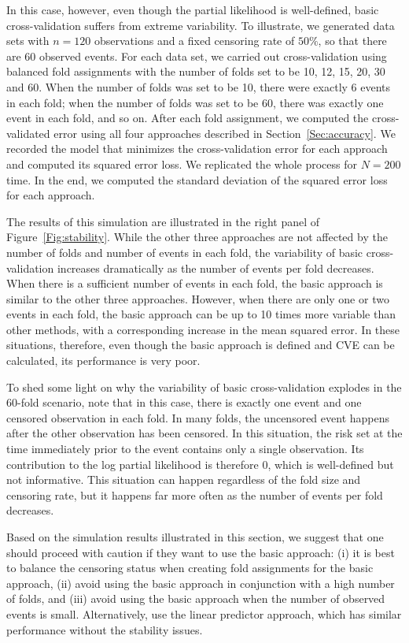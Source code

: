 In this case, however, even though the partial likelihood is well-defined, basic cross-validation suffers from extreme variability.  To illustrate, we generated data sets with $n = 120$ observations and a fixed censoring rate of $50\%$, so that there are 60 observed events. For each data set, we carried out cross-validation using balanced fold assignments with the number of folds set to be 10, 12, 15, 20, 30 and 60. When the number of folds was set to be 10, there were exactly 6 events in each fold; when the number of folds was set to be 60, there was exactly one event in each fold, and so on. After each fold assignment, we computed the cross-validated error using all four approaches described in Section~\ref{Sec:accuracy}. We recorded the model that minimizes the cross-validation error for each approach and computed its squared error loss. We replicated the whole process for $N = 200$ time. In the end, we computed the standard deviation of the squared error loss for each approach. 

The results of this simulation are illustrated in the right panel of Figure~\ref{Fig:stability}. While the other three approaches are not affected by the number of folds and number of events in each fold, the variability of basic cross-validation increases dramatically as the number of events per fold decreases. When there is a sufficient number of events in each fold, the basic approach is similar to the other three approaches. However, when there are only one or two events in each fold, the basic approach can be up to 10 times more variable than other methods, with a corresponding increase in the mean squared error.  In these situations, therefore, even though the basic approach is defined and CVE can be calculated, its performance is very poor.

To shed some light on why the variability of basic cross-validation explodes in the 60-fold scenario, note that in this case, there is exactly one event and one censored observation in each fold. In many folds, the uncensored event happens after the other observation has been censored. In this situation, the risk set at the time immediately prior to the event contains only a single observation. Its contribution to the log partial likelihood is therefore 0, which is well-defined but not informative. This situation can happen regardless of the fold size and censoring rate, but it happens far more often as the number of events per fold decreases.

Based on the simulation results illustrated in this section, we suggest that one should proceed with caution if they want to use the basic approach: (i) it is best to balance the censoring status when creating fold assignments for the basic approach, (ii) avoid using the basic approach in conjunction with a high number of folds, and (iii) avoid using the basic approach when the number of observed events is small. Alternatively, use the linear predictor approach, which has similar performance without the stability issues.

